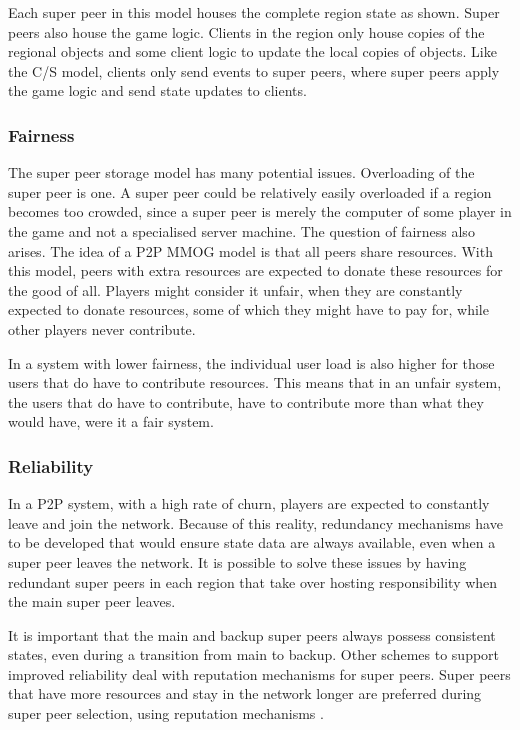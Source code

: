 \documentclass[10pt,a4paper,journal,cspaper,compsoc]{IEEEtran}
\begin{document}
Each super peer in this model houses the complete region state as shown. Super peers also house the game logic. Clients in the region only house
copies of the regional objects and some client logic to update the local copies of objects. Like the C/S model, clients only send events to super
peers, where super peers apply the game logic and send state updates to clients.

\subsubsection{Fairness}
The super peer storage model has many potential issues. Overloading of the super peer is one. A super peer could be relatively easily overloaded if a
region becomes too crowded, since a super peer is merely the computer of some player in the game and not a specialised server machine. The question
of fairness also arises. The idea of a P2P MMOG model is that all peers share resources. With this model, peers with extra resources are expected to
donate these resources for the good of all. Players might consider it unfair, when they are constantly expected to donate resources, some of which
they might have to pay for, while other players never contribute.

In a system with lower fairness, the individual user load is also higher for those users that do have to contribute resources. This means that in an
unfair system, the users that do have to contribute, have to contribute more than what they would have, were it a fair system.

\subsubsection{Reliability}
\label{super_peer_storage_reliability}

In a P2P system, with a high rate of churn, players are expected to constantly leave and join the network. Because of this reality, redundancy
mechanisms have to be developed that would ensure state data are always available, even when a super peer leaves the network. It is possible to solve
these issues by having redundant super peers in each region that take over hosting responsibility when the main super peer leaves.

It is important that the main and backup super peers always possess consistent states, even during a transition from main to backup. Other schemes to
support improved reliability deal with reputation mechanisms for super peers. Super peers that have more resources and stay in the network longer are
preferred during super peer selection, using reputation mechanisms \cite{fan_mediator_paper}.
\end{document}
